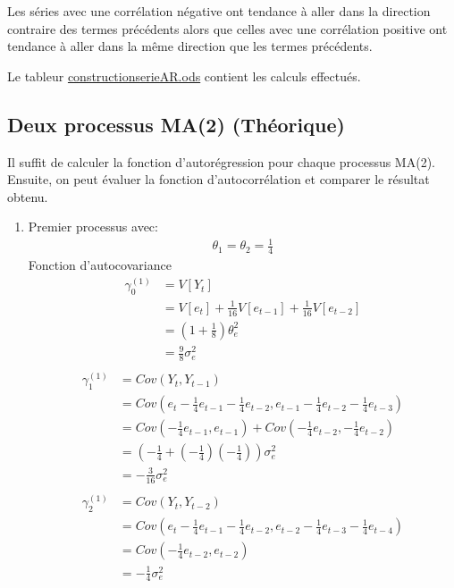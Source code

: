 \documentclass{article}
\begin{document}
Les séries avec une corrélation négative ont tendance à aller dans la direction contraire des termes précédents alors que celles avec une corrélation positive ont tendance à aller dans la même direction que les termes précédents.

Le tableur \url{constructionserieAR.ods} contient les calculs effectués.

\subsection{Deux processus MA(2) (Théorique)}

Il suffit de calculer la fonction d'autorégression pour chaque processus MA(2).
Ensuite, on peut évaluer la fonction d'autocorrélation et comparer le résultat obtenu.

\begin{enumerate}
\item Premier processus avec:
\begin{align*}
\theta_1 = \theta_2 = \frac{1}{4}
\end{align*}
Fonction d'autocovariance
\begin{align*}
\gamma_0^{(1)} &= V[Y_t] \\
&= V[e_t]+\frac{1}{16}V[e_{t-1}]+\frac{1}{16}V[e_{t-2}] \\
&= (1+\frac{1}{8})\theta^2_e \\
&= \frac{9}{8} \sigma^2_e \\
\end{align*}
\begin{align*}
\gamma_1^{(1)} &= Cov(Y_t,Y_{t-1}) \\
&= Cov(e_t - \frac{1}{4}e_{t-1} - \frac{1}{4}e_{t-2}, e_{t-1} - \frac{1}{4}e_{t-2} - \frac{1}{4}e_{t-3} )\\
&= Cov(-\frac{1}{4}e_{t-1},e_{t-1}) + Cov(-\frac{1}{4}e_{t-2},-\frac{1}{4}e_{t-2}) \\
&= (-\frac{1}{4}+(-\frac{1}{4})(-\frac{1}{4})) \sigma^2_e \\
&= -\frac{3}{16} \sigma^2_e \\
\end{align*}
\begin{align*}
\gamma_2^{(1)} &= Cov(Y_t,Y_{t-2}) \\
&= Cov(e_t - \frac{1}{4}e_{t-1} - \frac{1}{4}e_{t-2}, e_{t-2} - \frac{1}{4}e_{t-3} - \frac{1}{4}e_{t-4} )\\
&= Cov(-\frac{1}{4}e_{t-2},e_{t-2}) \\
&= -\frac{1}{4} \sigma^2_e \\

\end{align*}
\end{enumerate}
\end{document}
